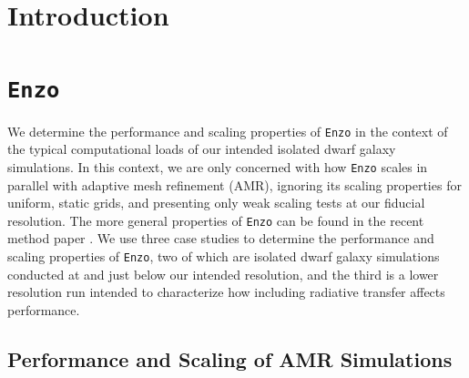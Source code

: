 \documentclass[11pt]{article}
\begin{document}
\maketitle

\section{Introduction}



\section{\texttt{Enzo}}

We determine the performance and scaling properties of \texttt{Enzo} in the context of the typical computational loads of our intended isolated dwarf galaxy simulations. In this context, we are only concerned with how \texttt{Enzo} scales in parallel with adaptive mesh refinement (AMR), ignoring its scaling properties for uniform, static grids, and presenting only weak scaling tests at our fiducial resolution. The more general properties of \texttt{Enzo} can be found in the recent method paper \citep{Enzo2014}. We use three case studies to determine the performance and scaling properties of \texttt{Enzo}, two of which are isolated dwarf galaxy simulations conducted at and just below our intended resolution, and the third is a lower resolution run intended to characterize how including radiative transfer affects performance.

\subsection{Performance and Scaling of AMR Simulations}
\end{document}
